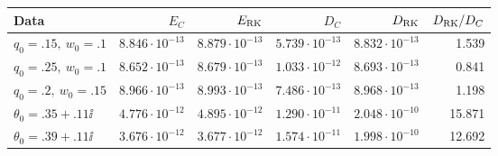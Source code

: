 \begin{tabular}{lrrrrr}
\toprule
Data & $E_C$ & $E_{\rm RK}$ & $D_C$ & $D_{\rm RK}$ & $D_{\rm RK}/D_C$\\
\midrule
$q_0=.15,\ w_0=.1$ & $8.846\cdot10^{-13}$ & $8.879\cdot10^{-13}$ & $5.739\cdot10^{-13}$ & $8.832\cdot10^{-13}$ & 1.539\\
$q_0=.25,\ w_0=.1$ & $8.652\cdot10^{-13}$ & $8.679\cdot10^{-13}$ & $1.033\cdot10^{-12}$ & $8.693\cdot10^{-13}$ & 0.841\\
$q_0=.2,\ w_0=.15$ & $8.966\cdot10^{-13}$ & $8.993\cdot10^{-13}$ & $7.486\cdot10^{-13}$ & $8.968\cdot10^{-13}$ & 1.198\\
$\theta_0=.35+.11\ii$ & $4.776\cdot10^{-12}$ & $4.895\cdot10^{-12}$ & $1.290\cdot10^{-11}$ & $2.048\cdot10^{-10}$ & 15.871\\
$\theta_0=.39+.11\ii$ & $3.676\cdot10^{-12}$ & $3.677\cdot10^{-12}$ & $1.574\cdot10^{-11}$ & $1.998\cdot10^{-10}$ & 12.692\\
\bottomrule
\end{tabular}
